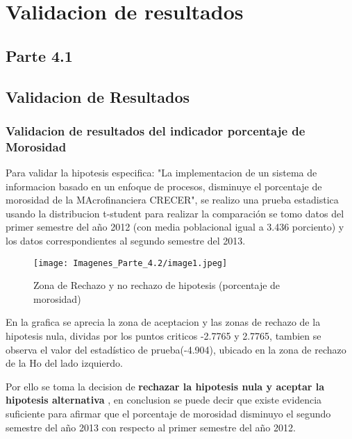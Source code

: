 \documentclass[12 pt, letterpaper]{article}
\begin{document}
\section{Validacion de resultados}
\subsection{Parte 4.1}
\subsection{Validacion de Resultados}
\subsubsection{Validacion de resultados del indicador porcentaje de Morosidad}
Para validar la hipotesis especifica: "La implementacion de un sistema de informacion basado en un enfoque de procesos, disminuye el porcentaje de morosidad de la MAcrofinanciera CRECER", se realizo una prueba estadistica usando la distribucion t-student para realizar la comparación se tomo datos del primer semestre del año 2012 (con media poblacional igual a 3.436 porciento) y los datos correspondientes al segundo semestre del 2013.
\begin{figure}[H]
    \texttt{[image: Imagenes\_Parte\_4.2/image1.jpeg]}
    \caption{Zona de Rechazo y no rechazo de hipotesis (porcentaje de morosidad)}
\end{figure}
En la grafica se aprecia la zona de aceptacion y las zonas de rechazo de la hipotesis nula, dividas por los puntos criticos -2.7765 y 2.7765, tambien se observa el valor del estadístico de prueba(-4.904), ubicado en la zona de rechazo de la Ho del lado izquierdo.
\begin{center}
\end{center}
Por ello se toma la decision de 
\textbf{rechazar la hipotesis nula y aceptar la hipotesis alternativa}
, en conclusion se puede decir que existe evidencia suficiente para afirmar que el porcentaje de morosidad disminuyo el segundo semestre del año 2013 con respecto al primer semestre del año 2012.
\end{document}

